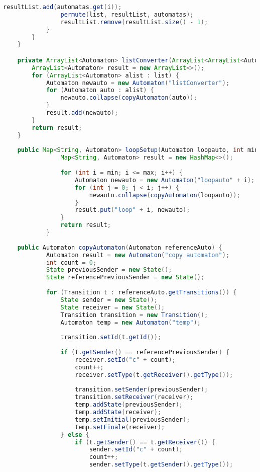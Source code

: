 \begin{lstlisting}[language=java, caption={Specification osztály.},captionpos=b]
                resultList.add(automatas.get(i));
                permute(list, resultList, automatas);
                resultList.remove(resultList.size() - 1);
            }
        }
    }

    private ArrayList<Automaton> listConverter(ArrayList<ArrayList<Automaton>> list) {
        ArrayList<Automaton> result = new ArrayList<>();
        for (ArrayList<Automaton> alist : list) {
            Automaton newauto = new Automaton("listConverter");
            for (Automaton auto : alist) {
                newauto.collapse(copyAutomaton(auto));
            }
            result.add(newauto);
        }
        return result;
    }
    
    public Map<String, Automaton> loopSetup(Automaton loopauto, int min, int max) {
	        	Map<String, Automaton> result = new HashMap<>();
	    	    
	            for (int i = min; i <= max; i++) {
	                Automaton newauto = new Automaton("loopauto" + i);
	                for (int j = 0; j < i; j++) {
	                    newauto.collapse(copyAutomaton(loopauto));
	                }
	                result.put("loop" + i, newauto);
	            }
	            return result;
	        }
    
    public Automaton copyAutomaton(Automaton referenceAuto) {
            Automaton result = new Automaton("copy automaton");
            int count = 0;
            State previousSender = new State();
            State referencePreviousSender = new State();
    
            for (Transition t : referenceAuto.getTransitions()) {
                State sender = new State();
                State receiver = new State();
                Transition transition = new Transition();
                Automaton temp = new Automaton("temp");
    
                transition.setId(t.getId());
    
                if (t.getSender() == referencePreviousSender) {
                    receiver.setId("c" + count);
                    count++;
                    receiver.setType(t.getReceiver().getType());
    
                    transition.setSender(previousSender);
                    transition.setReceiver(receiver);
                    temp.addState(previousSender);
                    temp.addState(receiver);
                    temp.setInitial(previousSender);
                    temp.setFinale(receiver);
                } else {
                    if (t.getSender() == t.getReceiver()) {
                        sender.setId("c" + count);
                        count++;
                        sender.setType(t.getSender().getType());
    

\end{lstlisting}
